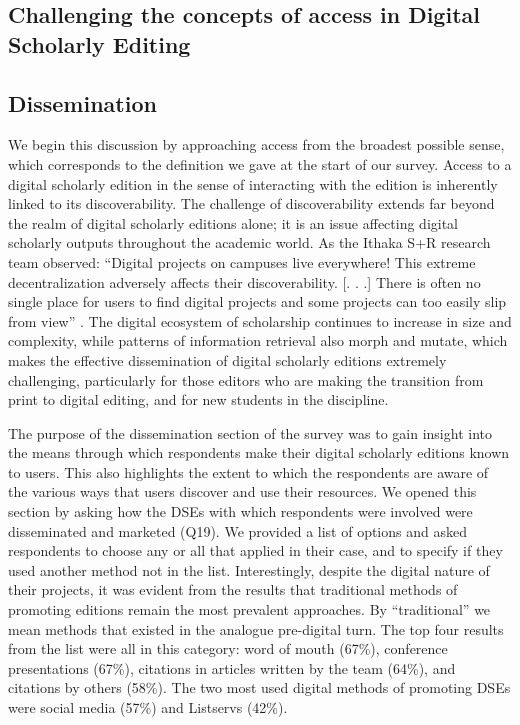 \begin{paper}
\section*{Challenging the concepts of access in Digital Scholarly
Editing}

\subsection{Dissemination}

We begin this discussion by approaching access from the broadest
possible sense, which corresponds to the definition we gave at the start
of our survey. Access to a digital scholarly edition in the sense of
interacting with the edition is inherently linked to its
discoverability. The challenge of discoverability extends far beyond the
realm of digital scholarly editions alone; it is an issue affecting
digital scholarly outputs throughout the academic world. As the Ithaka
S+R research team observed: ``Digital projects on campuses live
everywhere! This extreme decentralization adversely affects their
discoverability. {[}. . .{]} There is often no single place for users to
find digital projects and some projects can too easily slip from view'' \citep[4]{maron_sustaining_2013}. The digital ecosystem of scholarship
continues to increase in size and complexity, while patterns of
information retrieval also morph and mutate, which makes the effective
dissemination of digital scholarly editions extremely challenging,
particularly for those editors who are making the transition from print
to digital editing, and for new students in the discipline.

The purpose of the dissemination section of the survey was to gain
insight into the means through which respondents make their digital
scholarly editions known to users. This also highlights the extent to
which the respondents are aware of the various ways that users discover
and use their resources. We opened this section by asking how the DSEs
with which respondents were involved were disseminated and marketed
(Q19). We provided a list of options and asked respondents to choose any
or all that applied in their case, and to specify if they used another
method not in the list. Interestingly, despite the digital nature of
their projects, it was evident from the results that traditional methods
of promoting editions remain the most prevalent approaches. By
``traditional'' we mean methods that existed in the analogue pre-digital
turn. The top four results from the list were all in this category: word
of mouth (67\%), conference presentations (67\%), citations in articles
written by the team (64\%), and citations by others (58\%). The two most
used digital methods of promoting DSEs were social media (57\%) and
Listservs (42\%).


\end{paper}
